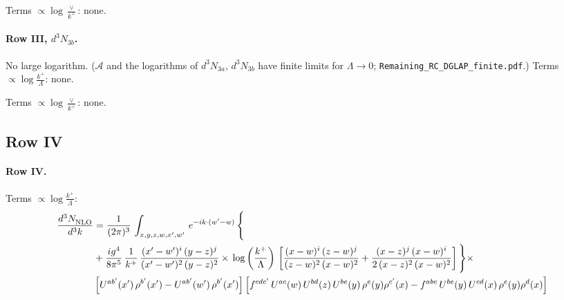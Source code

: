 \documentclass[10pt]{article}
\numberwithin{equation}{section}
\begin{document}
\noindent Terms $\propto\log\frac{\vee}{k^+}$: none.

\paragraph{Row III, $d^3N_{3b}$.}
No large logarithm. ($\mathcal A$ and the logarithms of $d^3N_{3a}$, $d^3N_{3b}$ have finite limits for $\Lambda\to0$; \texttt{Remaining\_RC\_DGLAP\_finite.pdf}.)
\noindent Terms $\propto\log\frac{k^+}{\Lambda}$: none.

\noindent Terms $\propto\log\frac{\vee}{k^+}$: none.

\subsection{Row IV}
\paragraph{Row IV.}
\noindent Terms $\propto\log\frac{k^+}{\Lambda}$:
\begin{align}
    \frac{d^{3}N_{\rm NLO}^{\rm}}{d^{3}k}  & =   \frac{1}{(2\pi)^{3}}\,
    \int_{x,y,z,w,x',w'}\,e^{-ik\cdot (w^\prime-w)}\,\Bigg\{\notag \\
& + \frac{ig^{4}}{8\pi^{5}}\,\frac{1}{k^{+}}\,\frac{(x'-w')^{i}\,(y-z)^{j}}{(x'-w')^{2}\,(y-z)^{2}}\times\,\log{\left(\frac{k^{+}}{\Lambda}\right)}\,\left[\frac{(x-w)^{i}\,(z-w)^{j}}{(z-w)^{2}\,(x-w)^{2}}+\frac{(x-z)^{j}\,(x-w)^{i}}{2\, (x-z)^{2}\,(x-w)^{2}}\right]\Bigg\}\times\notag \\ &  \left[U^{ab'}(x')\,\rho^{b'}(x')-U^{ab'}(w')\,\rho^{b'}(x')\right] \left[f^{cdc'}\,U^{ac}(w)\,U^{bd}(z)\,U^{be}(y)\,\rho^{e}(y)\rho^{c'}(x)-f^{abc}\,U^{be}(y)\,U^{cd}(x)\,\rho^{e}(y)\rho^{d}(x)\right] \label{eq:J:G1IV}
\end{align}
\end{document}
